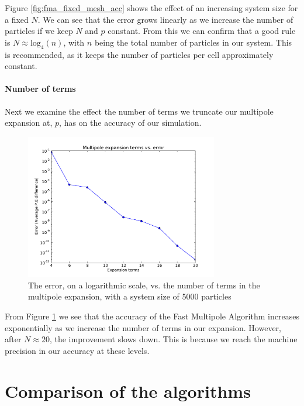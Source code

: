 \documentclass[pdftex,twoside,a4paper]{report}
\newcommand{\bcen}{\begin{center}}
\newcommand{\ecen}{\end{center}}
\newcommand{\fma}{Fast Multipole Algorithm}
\begin{document}
Figure \ref{fig:fma_fixed_mesh_acc} shows the effect of an increasing system size for a fixed $N$. We can see that the error grows linearly as we increase the number of particles if we keep $N$ and $p$ constant. From this we can confirm that a good rule is $N \approx \text{log}_4(n)$, with $n$ being the total number of particles in our system. This is recommended, as it keeps the number of particles per cell approximately constant. %

\subsubsection{Number of terms}
Next we examine the effect the number of terms we truncate our multipole expansion at, $p$, has on the accuracy of our simulation.
\begin{figure}
\bcen \includegraphics[width=0.75\textwidth]{figures/graphs/fma_terms_acc.pdf} \ecen
\caption{The error, on a logarithmic scale, vs. the number of terms in the multipole expansion, with a system size of 5000 particles}
\label{fig:fma_terms_acc}
\end{figure}

From Figure \ref{fig:fma_terms_acc} we see that the accuracy of the \fma{} increases exponentially as we increase the number of terms in our expansion. However, after $N \approx 20$, the improvement slows down. This is because we reach the machine precision in our accuracy at these levels.


\chapter{Comparison of the algorithms}
\label{chap:compare}
\end{document}
